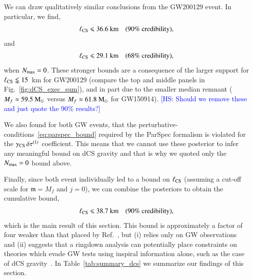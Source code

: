 \documentclass[twocolumn,
               prd,
               aps,
               superscriptaddress,
               tightenlines,
               nofootinbib,
               eqsecnum,
               amsfonts,
               amsmath,
               longbibliography]{revtex4-1}
\newcommand{\gm}{\mathfrak{m}}
\newcommand{\msun}{~{\rm M}_{\odot}}
\newcommand{\hs}[1]{{\textcolor{blue}{{[HS: #1]}} }}
\begin{document}
We can draw qualitatively similar conclusions from the GW200129 event.
In particular, we find,
%
\begin{equation}
\ell_{\rm CS} \leqslant 36.6~\textrm{km}
\quad \textrm{(90\% credibility)},
\end{equation}
%
and
%
\begin{equation}
\ell_{\rm CS} \leqslant 29.1~\textrm{km}
\quad \textrm{(68\% credibility)},
\end{equation}
%
when $N_{\rm max}=0$.
%
These stronger bounds are a consequence of the larger support for $\ell_{\rm CS} \lessapprox 15$~km
for GW200129 (compare the top and middle panels in Fig.~\ref{fig:dCS_exec_sum}), and in part due to
the smaller median remnant ($M_{f} \approx 59.5\msun$ versus $M_{f} \approx 61.8\msun$ for GW150914).
%
\hs{Should we remove these and just quote the 90\% results?}

We also found for both GW events, that the
perturbative-conditions~\eqref{eq:parspec_bound} required by the ParSpec
formalism is violated for the $\gamma_{\rm CS} \, \delta \tau^{(1)}$ coefficient.
%
This means that we cannot use these posterior to infer any meaningful bound on dCS gravity
and that is why we quoted only the $N_{\rm max}=0$ bound above.

Finally, since both event individually led to a bound on $\ell_{\rm CS}$
(assuming a cut-off scale for $\gm = M_{f}$ and $j = 0$), we can combine the
posteriors to obtain the cumulative bound,
%
\begin{equation}
\ell_{\rm CS} \leqslant 38.7~\textrm{km}
\quad \textrm{(90\% credibility)},
\end{equation}
%
which is the main result of this section.
%
This bound is approximately a factor of four weaker than that placed by
Ref.~\cite{Silva:2020acr}, but
%
(i) relies only on GW observations and
%
(ii) suggests that a ringdown analysis can potentially place constraints on
theories which evade GW tests using inspiral information alone, such as the
case of dCS gravity~\cite{Nair:2019iur,Perkins:2021mhb,Lyu:2022gdr}.
%
In Table~\ref{tab:summary_dcs} we summarize our findings of this section.
\end{document}
